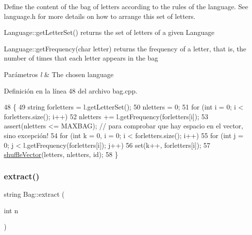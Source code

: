 Define the content of the bag of letters according to the rules of the language. See language.\+h for more details on how to arrange this set of letters. 


\begin{DoxyItemize}
\item Language\+::get\+Letter\+Set() returns the set of letters of a given Language
\item Language\+::get\+Frequency(char letter) returns the frequency of a letter, that is, the number of times that each letter appears in the bag 
\begin{DoxyParams}{Parámetros}
{\em l} & The chosen language \\
\hline
\end{DoxyParams}

\end{DoxyItemize}

Definición en la línea 48 del archivo bag.\+cpp.


\begin{DoxyCode}
48                                   \{
49     \textcolor{keywordtype}{string} forletters = l.getLetterSet();
50     nletters = 0;
51     \textcolor{keywordflow}{for} (\textcolor{keywordtype}{int} i = 0; i < forletters.size(); i++)
52         nletters += l.getFrequency(forletters[i]);  
53     assert(nletters <= MAXBAG); \textcolor{comment}{// para comprobar que hay espacio en el vector, sino excepción!}
54     \textcolor{keywordflow}{for} (\textcolor{keywordtype}{int} k = 0, i = 0; i < forletters.size(); i++)
55         \textcolor{keywordflow}{for} (\textcolor{keywordtype}{int} j = 0; j < l.getFrequency(forletters[i]); j++)
56             \textcolor{keyword}{set}(k++, forletters[i]);
57     \hyperlink{bag_8cpp_a93c24c436157bf4f753bd36d1e1d2e4a}{shuffleVector}(letters, nletters, \textcolor{keywordtype}{id});
58 \}
\end{DoxyCode}
\mbox{\label{classBag_ac75abe2b7626e50109a1add3382978af}} 
\subsubsection{\texorpdfstring{extract()}{extract()}}
{\footnotesize\ttfamily string Bag\+::extract (\begin{DoxyParamCaption}\item[{int}]{n }\end{DoxyParamCaption})}



